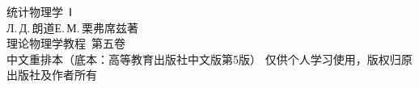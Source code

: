 \documentclass[11pt,a4paper,twoside,openright]{ctexbook}
\numberwithin{equation}{section}
\begin{document}
\begin{titlepage}
\thispagestyle{empty}
\centering
\vspace*{3.2cm}
{\heiti 统计物理学\ Ⅰ}\\[1.2em]
{\kaishu Л.\,Д.\,朗道\quad Е.\,М.\,栗弗席兹\quad 著}\\[3em]
{\kaishu 理论物理学教程\ 第五卷}\\[2em]
{\kaishu 中文重排本（底本：高等教育出版社中文版第5版）}
\vfill
{\kaishu 仅供个人学习使用，版权归原出版社及作者所有}
\end{titlepage}

{\hypersetup{linktoc=all}\tableofcontents}
\clearpage

















\end{document}
